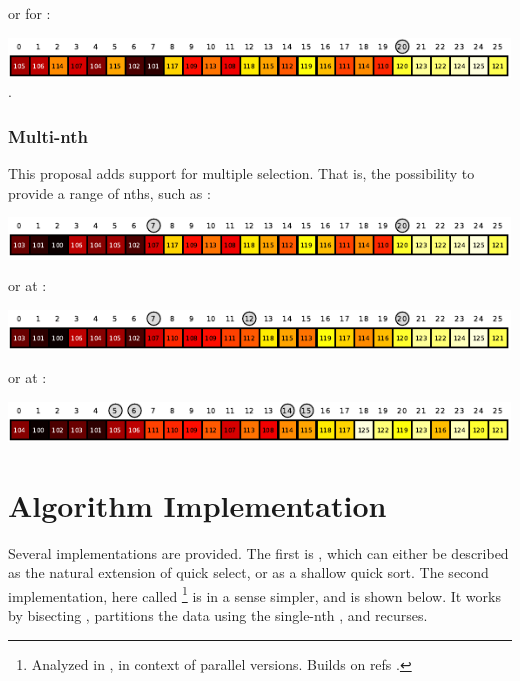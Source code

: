 or for :

\includegraphics[width=0.999\textwidth]{plotting/figs/1b.pdf}.

\subsubsection*{Multi-nth }

This proposal adds support for multiple selection. That is, the possibility to provide a range of nths, such as  :

\includegraphics[width=0.999\textwidth]{plotting/figs/2.pdf}

or at :

\includegraphics[width=0.999\textwidth]{plotting/figs/3.pdf}

or  at :

\includegraphics[width=0.999\textwidth]{plotting/figs/qs.pdf}

\newpage
\section{Algorithm Implementation}
\label{Implementation}
\label{Implement}

Several implementations are provided\cite{p2375RefImpl}. The first is , which can either be described as the natural extension of quick select, or as a shallow quick sort. The second implementation, here called \footnote{Analyzed in \cite{Alsuwaiyel2001}, in context of 
parallel versions. Builds on refs \cite{Akl1984,Akl1989,Shen1997}.} 
 is in a sense simpler, and is shown below. It works by bisecting , partitions the data using the single-nth , and recurses. 

